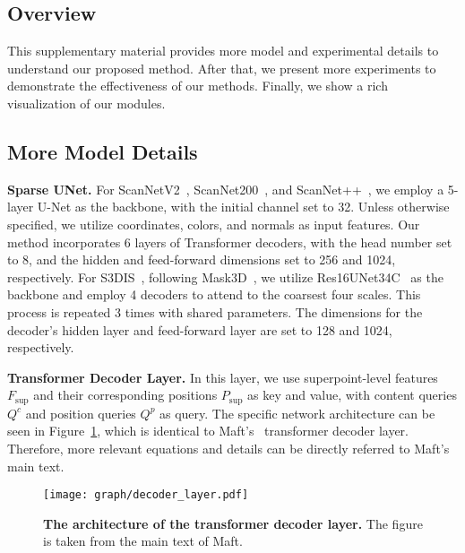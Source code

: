 \subsection{Overview}

This supplementary material provides more model and experimental details to understand our proposed method. After that, we present more experiments to demonstrate the effectiveness of our methods. Finally, we show a rich visualization of our modules. 

\subsection{More Model Details}
\textbf{Sparse UNet.}  
For ScanNetV2~\cite{dai2017scannet}, ScanNet200~\cite{rozenberszki2022language}, and ScanNet++~\cite{yeshwanth2023scannet++}, we employ a 5-layer U-Net as the backbone, with the initial channel set to 32. 
%
Unless otherwise specified, we utilize coordinates, colors, and normals as input features. 
%
Our method incorporates 6 layers of Transformer decoders, with the head number set to 8, and the hidden and feed-forward dimensions set to 256 and 1024, respectively.
%
For S3DIS~\cite{armeni20163d}, following Mask3D~\cite{schult2022mask3d}, we utilize Res16UNet34C~\cite{choy20194d} as the backbone and employ 4 decoders to attend to the coarsest four scales. 
%
This process is repeated 3 times with shared parameters. The dimensions for the decoder's hidden layer and feed-forward layer are set to 128 and 1024, respectively.

\textbf{Transformer Decoder Layer.} In this layer, we use superpoint-level features $F_{\text{sup}}$ and their corresponding positions $P_{\text{sup}}$ as key and value, with content queries $Q^c$ and position queries $Q^p$ as query. 
The specific network architecture can be seen in Figure~\ref{decoder}, which is identical to Maft's~\cite{lai2023mask} transformer decoder layer. Therefore, more relevant equations and details can be directly referred to Maft's main text.
\begin{figure}[!ht]
  \begin{center}
      \texttt{[image: graph/decoder\_layer.pdf]}
      \caption{\textbf{The architecture of the transformer decoder layer.} The figure is taken from the main text of Maft. }
      \label{decoder}
  \end{center}
\end{figure}

